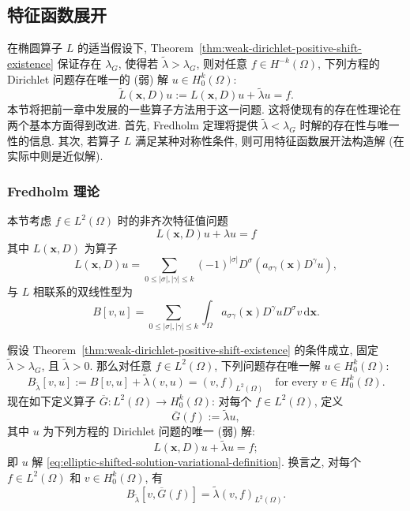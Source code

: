 \subsection{特征函数展开}\label{sec:elliptic-eigenfunction-expansions}

在椭圆算子 $L$ 的适当假设下, Theorem~\ref{thm:weak-dirichlet-positive-shift-existence} 保证存在 $\lambda_G$, 使得若 $\widetilde\lambda>\lambda_G$, 则对任意 $f\in H^{-k}(\Omega)$, 下列方程的 Dirichlet 问题存在唯一的 (弱) 解 $u\in H_0^k(\Omega)$:\[\widetilde L(\bm{x},D)u:=L(\bm{x},D)u+\widetilde\lambda u=f.\]本节将把前一章中发展的一些算子方法用于这一问题. 这将使现有的存在性理论在两个基本方面得到改进. 首先, Fredholm 定理将提供 $\widetilde\lambda<\lambda_G$ 时解的存在性与唯一性的信息. 其次, 若算子 $L$ 满足某种对称性条件, 则可用特征函数展开法构造解 (在实际中则是近似解).

\subsubsection{Fredholm 理论}\label{subsec:elliptic-fredholm-theory}

本节考虑 $f\in L^2(\Omega)$ 时的非齐次特征值问题
\begin{equation}\label{eq:elliptic-nonhomogeneous-shifted-eigenvalue-problem}
L(\bm{x},D)u+\lambda u=f
\end{equation}
其中 $L(\bm{x},D)$ 为算子\[L(\bm{x},D)u=\sum_{0\leq|\sigma|,|\gamma|\leq k}(-1)^{|\sigma|}D^\sigma(a_{\sigma\gamma}(\bm{x})D^\gamma u),\]与 $L$ 相联系的双线性型为\[B[v,u]=\sum_{0\leq|\sigma|,|\gamma|\leq k}\int_\Omega a_{\sigma\gamma}(\bm{x})D^\gamma uD^\sigma v\,\mathrm{d}\bm{x}.\]

假设 Theorem~\ref{thm:weak-dirichlet-positive-shift-existence} 的条件成立, 固定 $\widetilde\lambda>\lambda_G$, 且 $\widetilde\lambda>0$. 那么对任意 $f\in L^2(\Omega)$, 下列问题存在唯一解 $u\in H_0^k(\Omega)$:
\begin{equation}\label{eq:elliptic-shifted-solution-variational-definition}
B_{\widetilde\lambda}[v,u]:=B[v,u]+\widetilde\lambda(v,u)=(v,f)_{L^2(\Omega)}\quad\text{for every }v\in H_0^k(\Omega).
\end{equation}
现在如下定义算子 $\overline G:L^2(\Omega)\to H_0^k(\Omega)$: 对每个 $f\in L^2(\Omega)$, 定义
\begin{equation}\label{eq:elliptic-sobolev-solution-operator-definition}
\overline G(f):=\widetilde\lambda u,
\end{equation}
其中 $u$ 为下列方程的 Dirichlet 问题的唯一 (弱) 解:
\begin{equation}\label{eq:elliptic-solution-operator-shifted-dirichlet-equation}
L(\bm{x},D)u+\widetilde\lambda u=f;
\end{equation}
即 $u$ 解 \eqref{eq:elliptic-shifted-solution-variational-definition}. 换言之, 对每个 $f\in L^2(\Omega)$ 和 $v\in H_0^k(\Omega)$, 有
\begin{equation}\label{eq:elliptic-sobolev-solution-operator-variational-identity}
B_{\widetilde\lambda}[v,\overline G(f)]=\widetilde\lambda(v,f)_{L^2(\Omega)}.
\end{equation}


